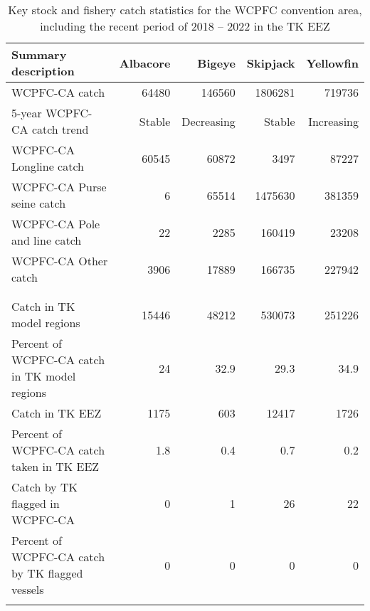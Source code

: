 \begin{longtable}{lrrrr}
\caption{Key stock and fishery catch statistics for the WCPFC convention area, including the recent period of 2018 -- 2022 in the TK EEZ} \\ 
  \hline
Summary description & Albacore & Bigeye & Skipjack & Yellowfin \\ 
  \hline
WCPFC-CA catch & 64480 & 146560 & 1806281 & 719736 \\ 
  5-year WCPFC-CA catch trend & Stable & Decreasing & Stable & Increasing \\ 
  WCPFC-CA Longline catch & 60545 & 60872 & 3497 & 87227 \\ 
  WCPFC-CA Purse seine catch & 6 & 65514 & 1475630 & 381359 \\ 
  WCPFC-CA Pole and line catch & 22 & 2285 & 160419 & 23208 \\ 
  WCPFC-CA Other catch & 3906 & 17889 & 166735 & 227942 \\ 
   &  &  &  &  \\ 
   \hline
 &  &  &  &  \\ 
  Catch in TK model regions & 15446 & 48212 & 530073 & 251226 \\ 
  Percent of WCPFC-CA catch in TK model regions & 24 & 32.9 & 29.3 & 34.9 \\ 
  Catch in TK EEZ & 1175 & 603 & 12417 & 1726 \\ 
  Percent of WCPFC-CA catch taken in TK EEZ & 1.8 & 0.4 & 0.7 & 0.2 \\ 
  Catch by TK flagged in WCPFC-CA & 0 & 1 & 26 & 22 \\ 
  Percent of WCPFC-CA catch by TK flagged vessels & 0 & 0 & 0 & 0 \\ 
  \hline
\label{cat_sum_tab}
\end{longtable}
